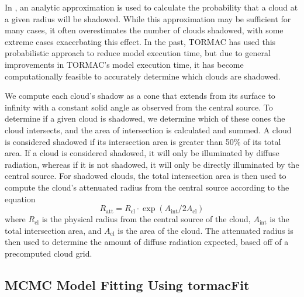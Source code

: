 \par In \cite{almeyda_modeling_2017,almeyda_modeling_2020}, an analytic approximation is used to calculate the probability that a cloud at a given radius will be shadowed. While this approximation may be sufficient for many cases, it often overestimates the number of clouds shadowed, with some extreme cases exacerbating this effect. In the past, TORMAC has used this probabilistic approach to reduce model execution time, but due to general improvements in TORMAC's model execution time, it has become computationally feasible to accurately determine which clouds are shadowed.

We compute each cloud's shadow as a cone that extends from its surface to infinity with a constant solid angle as observed from the central source. To determine if a given cloud is shadowed, we determine which of these cones the cloud intersects, and the area of intersection is calculated and summed. A cloud is considered shadowed if its intersection area is greater than 50\% of its total area. If a cloud is considered shadowed, it will only be illuminated by diffuse radiation, whereas if it is not shadowed, it will only be directly illuminated by the central source.  For shadowed clouds, the total intersection area is then used to compute the cloud's attenuated radius from the central source according to the equation
$$R_{\text{att}} = R_{\text{cl}} \cdot \exp{\left(A_{\text{int}}/2A_{\text{cl}}\right)}$$
where $R_{\text{cl}}$ is the physical radius from the central source of the cloud, $A_{\text{int}}$ is the total intersection area, and $A_{\text{cl}}$ is the area of the cloud. The attenuated radius is then used to determine the amount of diffuse radiation expected, based off of a precomputed cloud grid.  

\subsection{MCMC Model Fitting Using tormacFit} \label{sec:tormacFit}

